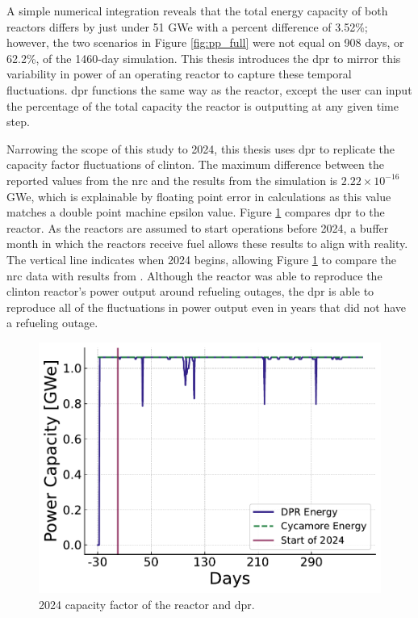 A simple numerical integration reveals that the total energy capacity of both reactors differs by just under 51 GWe with a percent difference of 3.52\%; however, the two scenarios in Figure \ref{fig:pp_full} were not equal on 908 days, or 62.2\%, of the 1460-day simulation. This thesis introduces the \gls{dpr} to mirror this variability in power of an operating reactor to capture these temporal fluctuations. \gls{dpr} functions the same way as the \cycamore reactor, except the user can input the percentage of the total capacity the reactor is outputting at any given time step.



Narrowing the scope of this study to 2024, this thesis uses \gls{dpr} to replicate the capacity factor fluctuations of \gls{clinton}. The maximum difference between the reported values from the \gls{nrc} \cite{nrc_power_2025} and the results from the \cyclus simulation is $2.22 \times 10^{-16}$ GWe, which is explainable by floating point error in calculations as this value matches a double point machine epsilon value. Figure \ref{fig:dpr_cycamore_power} compares \gls{dpr} to the \cycamore reactor. As the reactors are assumed to start operations before 2024, a buffer month in which the reactors receive fuel allows these results to align with reality. The vertical line indicates when 2024 begins, allowing Figure \ref{fig:dpr_cycamore_power} to compare the \gls{nrc} data with results from \cyclus. Although the \cycamore reactor was able to reproduce the \gls{clinton} reactor's power output around refueling outages, the \gls{dpr} is able to reproduce all of the fluctuations in power output even in years that did not have a refueling outage.

\begin{figure}[H]
  \centering
  \includegraphics[width=0.7\linewidth]{images/power_reactor/dpr_cycamore_energy.pdf}
  \caption{2024 capacity factor of the \cycamore reactor and \gls{dpr}.}
  \label{fig:dpr_cycamore_power}
\end{figure}

